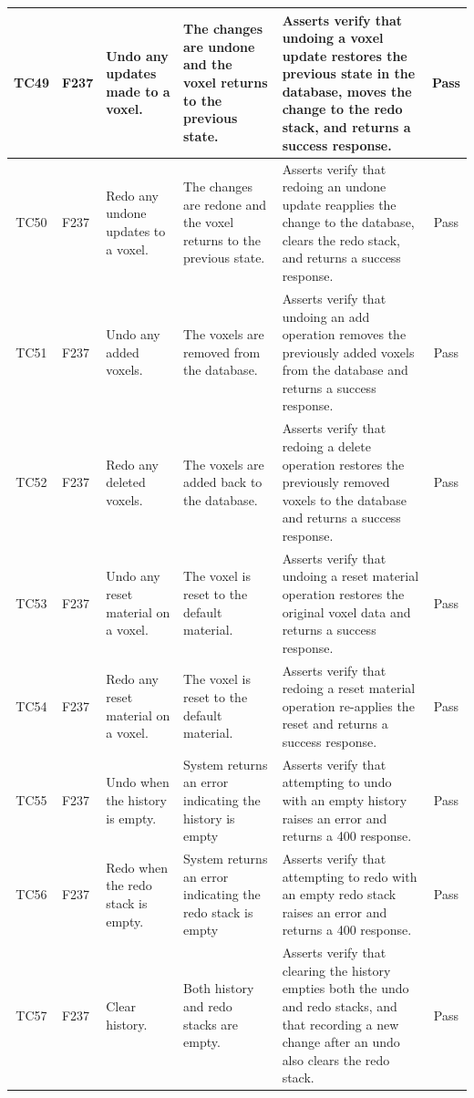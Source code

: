 \documentclass[12pt, titlepage]{article}
\begin{document}
\begin{longtable}{c
    >{\raggedright\arraybackslash}p{1.5cm}
    >{\raggedright\arraybackslash}p{3cm}
    >{\raggedright\arraybackslash}p{3cm}
  >{\raggedright\arraybackslash}p{4.5cm} c}
  TC49 & F237 & Undo any updates made to a voxel. & The changes are undone and the voxel returns to the previous state. & Asserts verify that undoing a voxel update restores the previous state in the database, moves the change to the redo stack, and returns a success response. & \cellcolor{green} Pass \\ \midrule
  TC50 & F237 & Redo any undone updates to a voxel. & The changes are redone and the voxel returns to the previous state. & Asserts verify that redoing an undone update reapplies the change to the database, clears the redo stack, and returns a success response. & \cellcolor{green} Pass \\ \midrule
  TC51 & F237 & Undo any added voxels. & The voxels are removed from the database. & Asserts verify that undoing an add operation removes the previously added voxels from the database and returns a success response. & \cellcolor{green} Pass \\ \midrule
  TC52 & F237 & Redo any deleted voxels. & The voxels are added back to the database. & Asserts verify that redoing a delete operation restores the previously removed voxels to the database and returns a success response. & \cellcolor{green} Pass \\ \midrule
  TC53 & F237 & Undo any reset material on a voxel. & The voxel is reset to the default material. & Asserts verify that undoing a reset material operation restores the original voxel data and returns a success response. & \cellcolor{green} Pass \\ \midrule
  TC54 & F237 & Redo any reset material on a voxel. & The voxel is reset to the default material. & Asserts verify that redoing a reset material operation re-applies the reset and returns a success response. & \cellcolor{green} Pass \\ \midrule
  TC55 & F237 & Undo when the history is empty. & System returns an error indicating the history is empty & Asserts verify that attempting to undo with an empty history raises an error and returns a 400 response. & \cellcolor{green} Pass \\ \midrule
  TC56 & F237 & Redo when the redo stack is empty. & System returns an error indicating the redo stack is empty & Asserts verify that attempting to redo with an empty redo stack raises an error and returns a 400 response. & \cellcolor{green} Pass \\ \midrule
  TC57 & F237 & Clear history. & Both history and redo stacks are empty. & Asserts verify that clearing the history empties both the undo and redo stacks, and that recording a new change after an undo also clears the redo stack. & \cellcolor{green} Pass \\
\end{longtable}
\end{document}
